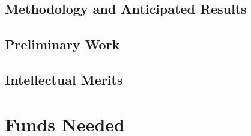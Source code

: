 \subsection{Methodology and Anticipated Results}


\subsection{Preliminary Work}


\subsection{Intellectual Merits}

\section{Funds Needed}


